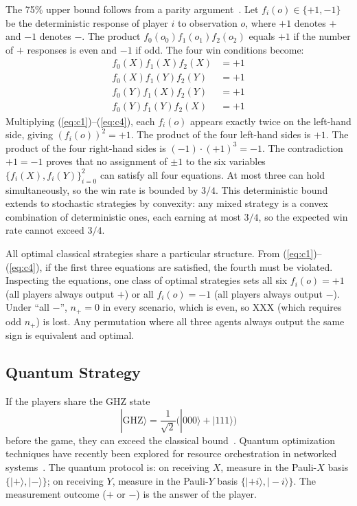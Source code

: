 \documentclass[journal]{IEEEtran}
\begin{document}
The 75\% upper bound follows from a parity argument~\cite{mermin1990mysteries}. Let $f_i(o) \in \{+1, -1\}$ be the deterministic response of player $i$ to observation $o$, where $+1$ denotes $+$ and $-1$ denotes $-$. The product $f_0(o_0) f_1(o_1) f_2(o_2)$ equals $+1$ if the number of $+$ responses is even and $-1$ if odd. The four win conditions become:
\begin{align}
    f_0(X) f_1(X) f_2(X) &= +1 \label{eq:c1} \\
    f_0(X) f_1(Y) f_2(Y) &= +1 \label{eq:c2} \\
    f_0(Y) f_1(X) f_2(Y) &= +1 \label{eq:c3} \\
    f_0(Y) f_1(Y) f_2(X) &= +1 \label{eq:c4}
\end{align}
Multiplying (\ref{eq:c1})--(\ref{eq:c4}), each $f_i(o)$ appears exactly twice on the left-hand side, giving $(f_i(o))^2 = +1$. The product of the four left-hand sides is $+1$. The product of the four right-hand sides is $(-1) \cdot (+1)^3 = -1$. The contradiction $+1 = -1$ proves that no assignment of $\pm 1$ to the six variables $\{f_i(X), f_i(Y)\}_{i=0}^2$ can satisfy all four equations. At most three can hold simultaneously, so the win rate is bounded by $3/4$. This deterministic bound extends to stochastic strategies by convexity: any mixed strategy is a convex combination of deterministic ones, each earning at most $3/4$, so the expected win rate cannot exceed $3/4$.

All optimal classical strategies share a particular structure. From (\ref{eq:c1})--(\ref{eq:c4}), if the first three equations are satisfied, the fourth must be violated. Inspecting the equations, one class of optimal strategies sets all six $f_i(o) = +1$ (all players always output $+$) or all $f_i(o) = -1$ (all players always output $-$). Under ``all $-$'', $n_+ = 0$ in every scenario, which is even, so XXX (which requires odd $n_+$) is lost. Any permutation where all three agents always output the same sign is equivalent and optimal.

\subsection{Quantum Strategy}

If the players share the GHZ state
\begin{equation}
    |\text{GHZ}\rangle = \frac{1}{\sqrt{2}}\bigl(|000\rangle + |111\rangle\bigr)
\end{equation}
before the game, they can exceed the classical bound~\cite{brassard2003}. Quantum optimization techniques have recently been explored for resource orchestration in networked systems~\cite{zheng2025power}. The quantum protocol is: on receiving $X$, measure in the Pauli-$X$ basis $\{|+\rangle, |-\rangle\}$; on receiving $Y$, measure in the Pauli-$Y$ basis $\{|+i\rangle, |-i\rangle\}$. The measurement outcome ($+$ or $-$) is the answer of the player.
\end{document}
